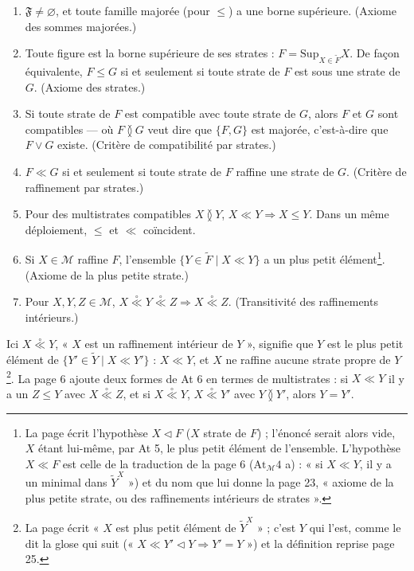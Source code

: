 \documentclass[11pt,a4paper]{article}
\begin{document}
\begin{enumerate}
\item[\textbf{At 1}] $\mathfrak{F} \neq \varnothing$, et toute famille majorée
(pour $\leq$) a une borne supérieure. (Axiome des sommes majorées.)
\item[\textbf{At 2}] Toute figure est la borne supérieure de ses strates : $F =
\mathrm{Sup}_{X \in \widetilde{F}} X$. De façon équivalente, $F \leq G$ si et
seulement si toute strate de $F$ est sous une strate de $G$. (Axiome des
strates.)
\item[\textbf{At 3}] Si toute strate de $F$ est compatible avec toute strate de
$G$, alors $F$ et $G$ sont compatibles --- où $F \between G$ veut dire que $\{F,
G\}$ est majorée, c'est-à-dire que $F \vee G$ existe. (Critère de compatibilité
par strates.)
\item[\textbf{At 4}] $F \ll G$ si et seulement si toute strate de $F$ raffine une
strate de $G$. (Critère de raffinement par strates.)
\item[\textbf{At 5}] Pour des multistrates compatibles $X \between Y$, $X \ll Y
\Rightarrow X \leq Y$. Dans un même déploiement, $\leq$ et $\ll$ coïncident.
\item[\textbf{At 6}] Si $X \in \mathcal{M}$ raffine $F$, l'ensemble $\{Y \in
\widetilde{F} \mid X \ll Y\}$ a un plus petit élément\footnote{La page écrit
l'hypothèse $X \triangleleft F$ ($X$ strate de $F$) ; l'énoncé serait alors vide,
$X$ étant lui-même, par At 5, le plus petit élément de l'ensemble. L'hypothèse
$X \ll F$ est celle de la traduction de la page 6 ($\mathrm{At}_{\mathcal{M}} 4$
a) : « si $X \ll Y$, il y a un minimal dans $\widetilde{Y}^{X}$ ») et du nom que
lui donne la page 23, « axiome de la plus petite strate, ou des raffinements
intérieurs de strates ».}. (Axiome de la plus petite strate.)
\item[\textbf{At 7}] Pour $X, Y, Z \in \mathcal{M}$, $X \mathrel{\overset{\circ}{\ll}}
Y \mathrel{\overset{\circ}{\ll}} Z \Rightarrow X \mathrel{\overset{\circ}{\ll}} Z$.
(Transitivité des raffinements intérieurs.)
\end{enumerate}

Ici $X \mathrel{\overset{\circ}{\ll}} Y$, « $X$ est un raffinement intérieur de
$Y$ », signifie que $Y$ est le plus petit élément de $\{Y' \in \widetilde{Y} \mid
X \ll Y'\}$ : $X \ll Y$, et $X$ ne raffine aucune strate propre de
$Y$\footnote{La page écrit « $X$ est plus petit élément de $\widetilde{Y}^{X}$ » ;
c'est $Y$ qui l'est, comme le dit la glose qui suit (« $X \ll Y' \triangleleft Y
\Rightarrow Y' = Y$ ») et la définition reprise page 25.}. La page 6 ajoute
deux formes de At 6 en termes de multistrates : si $X \ll Y$ il y a un $Z \leq Y$
avec $X \mathrel{\overset{\circ}{\ll}} Z$, et si $X
\mathrel{\overset{\circ}{\ll}} Y$, $X \mathrel{\overset{\circ}{\ll}} Y'$ avec $Y
\between Y'$, alors $Y = Y'$.
\end{document}

